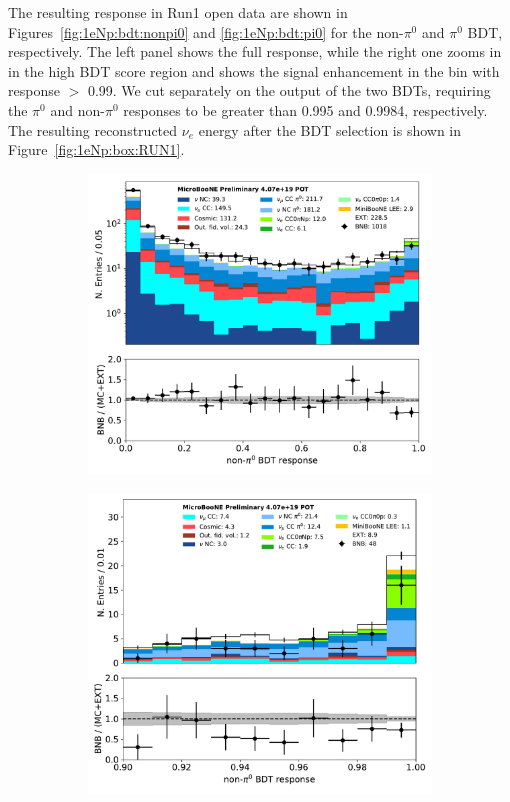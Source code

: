 \documentclass[a4paper]{article}
\newcommand{\nue}{$\nu_e$ }
\begin{document}
The resulting response in Run1 open data are shown in Figures~\ref{fig:1eNp:bdt:nonpi0} and \ref{fig:1eNp:bdt:pi0} for the non-$\pi^0$ and $\pi^0$ BDT, respectively. The left panel shows the full response, while the right one zooms in in the high BDT score region and shows the signal enhancement in the bin with response $>$ 0.99. We cut separately on the output of the two BDTs, requiring the $\pi^0$ and non-$\pi^0$ responses to be greater than 0.995 and 0.9984, respectively. The resulting reconstructed \nue energy after the BDT selection is shown in Figure~\ref{fig:1eNp:box:RUN1}.

\begin{figure}[H] 
\begin{center}
    \begin{subfigure}[b]{0.45\textwidth}
    \centering
    \includegraphics[width=1.00\textwidth]{1eNp/nonpi0_score_01162020_RUN1.pdf}
    \caption{\label{fig:1eNp:bdt:nonpi0:all}}
    \end{subfigure}
    \begin{subfigure}[b]{0.45\textwidth}
    \centering
    \includegraphics[width=1.00\textwidth]{1eNp/nonpi0_score_zoom_01162020_RUN1.pdf}

\end{subfigure}
\end{center}
\end{figure}
\end{document}
